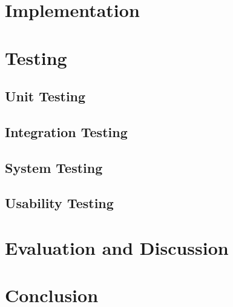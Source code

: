 \documentclass[11pt]{article}
\begin{document}
%

\section{Implementation} \label{implementation}

\section{Testing} \label{testing}

\subsection{Unit Testing} \label{unit-testing}

\subsection{Integration Testing} \label{integration-testing}

\subsection{System Testing} \label{system-testing}

\subsection{Usability Testing} \label{usability-testing}


\section{Evaluation and Discussion} \label{evaluation-discussion}

\section{Conclusion} \label{conclusion}


%
 
\end{document}
